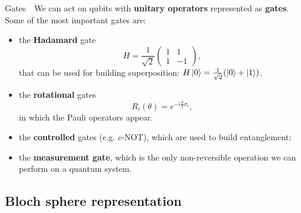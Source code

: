 \documentclass[8pt, xcolor={svgnames}, hyperref={colorlinks,linkcolor=black, citecolor=amethyst, urlcolor=amethyst}]{beamer}
\begin{document}
\begin{frame}{Gates}
\large
    \faArrowCircleRight\,\, We can act on qubits with \textbf{unitary operators} 
    represented as \textbf{gates}.
    Some of the most important gates are:
    \begin{itemize}
        \item<1->[\faCaretRight] the \textbf{Hadamard} gate
    \begin{equation*}
        H = \frac{1}{\sqrt{2}} \begin{pmatrix} 
        1 & 1 \\ 
        1 & -1
        \end{pmatrix},
    \end{equation*}
    that can be used for building superposition: $H \ket{0} = \frac{1}{\sqrt{2}} (\ket{0} + \ket{1})$.

    \item<2->[\faCaretRight] the \textbf{rotational} gates \color{black}
    \begin{equation*}
        R_i(\theta) = e^{-i \frac{\theta}{2} \sigma_i},
    \end{equation*} in which the Pauli operators appear.

    \item<3->[\faCaretRight] the \textbf{controlled} gates (e.g. c-NOT), which are used to build entanglement;

    \item<4->[\faCaretRight] the \textbf{measurement gate}, which is the only 
    non-reversible operation we can perform on a quantum system.

 \end{itemize}
    
\end{frame}

\subsection{Bloch sphere representation}
\end{document}
